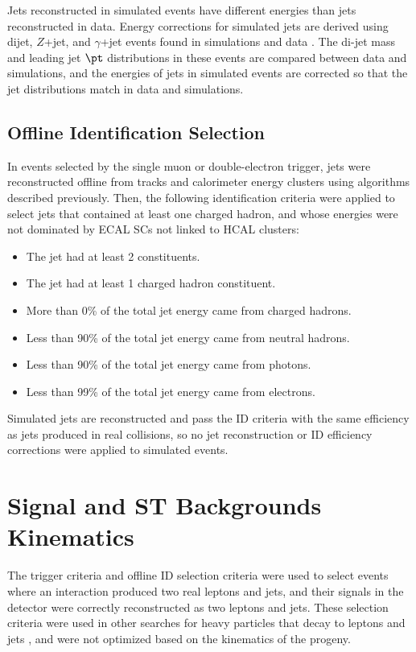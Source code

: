 Jets reconstructed in simulated events have different energies than jets reconstructed in data.  Energy corrections for 
simulated jets are derived using dijet, $Z$+jet, and $\gamma$+jet events found in simulations and data 
\cite{jetpaper}.  The di-jet mass and leading jet $\pt$ distributions in these events are compared between data and simulations, and 
the energies of jets in simulated events are corrected so that the jet distributions match in data and simulations.

\subsection{Offline Identification Selection}
In events selected by the single muon or double-electron trigger, jets were reconstructed offline from tracks and calorimeter energy 
clusters using algorithms described previously.  Then, the following identification criteria were applied to select 
jets that contained at least one charged hadron, and whose energies were not dominated by ECAL SCs not linked to HCAL clusters:

\begin{itemize}
	\item The jet had at least 2 constituents.
	\item The jet had at least 1 charged hadron constituent.
	\item More than 0\% of the total jet energy came from charged hadrons.
	\item Less than 90\% of the total jet energy came from neutral hadrons.
	\item Less than 90\% of the total jet energy came from photons.
	\item Less than 99\% of the total jet energy came from electrons.
\end{itemize}

Simulated jets are reconstructed and pass the ID criteria with the same efficiency as jets produced in real collisions, so no jet 
reconstruction or ID efficiency corrections were applied to simulated events.


\section{\WR Signal and ST Backgrounds Kinematics}
\label{sec:signalAndBkgnds}
The trigger criteria and offline ID selection criteria were used to select events where an interaction produced two real leptons and jets, 
and their signals in the detector were correctly reconstructed as two leptons and jets.  These selection criteria were used in other 
searches for heavy particles that decay to leptons and jets \cite{exoLeptJetResults}, and were not optimized based on the kinematics of 
the \WR progeny.

